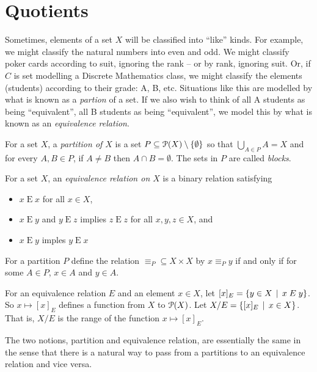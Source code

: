 \section{Quotients}

Sometimes, elements of a set $X$ will be classified into ``like'' kinds. 
For example, we might classify the natural numbers into even and odd. 
We might classify poker cards according to suit, ignoring the rank -- or by rank, ignoring suit. 
Or, if $C$ is  set modelling a Discrete Mathematics class, we might classify the elements (students) according to their grade: A, B, etc. 
Situations like this are modelled by what is known as a \emph{partion} of a set. If we also wish to think of all A students as being ``equivalent'', all B students as being ``equivalent'', we model this by what is known as an \emph{equivalence relation}.

\begin{defn}
	For a set $X$, a \emph{partition of $X$} is a set $P\subseteq{\mathcal{P}}(X)\setminus\{\emptyset\}$ so that $\bigcup_{A\in P}A = X$ and for every $A,B\in P$, if $A\neq B$ then $A\cap B=\emptyset$. The sets in $P$ are called \emph{blocks}. 
	
	For a set $X$, an \emph{equivalence relation on $X$} is a binary relation satisfying
	\begin{itemize}
		\item $x \mathrel{E}x$ for all $x\in X$,
		\item $x\mathrel{E}y$ and $y\mathrel{E}z$ implies $z\mathrel{E}z$ for all $x,y,z\in X$, and 
		\item $x\mathrel{E}y$ imples $y\mathrel{E}x$
	\end{itemize}
	
	For a partition $P$ define the relation $\mathord{\equiv_P}\subseteq X\times X$ by $x\equiv_P y$ if and only if for some $A\in P$, $x\in A$ and $y\in A$.
	
	For an equivalence relation $E$ and an element $x\in X$, let $[x]_E = \{y\in X\,\mid\, x\mathrel{E} y\}$. So $x\mapsto [x]_E$ defines a function from $X$ to ${\mathcal{P}}(X)$. Let $X/E= \{[x]_E\,\mid\, x\in X\}$.
	That is, $X/E$ is the range of the function $x\mapsto [x]_E$.
\end{defn}

The two notions, partition and equivalence relation, are essentially the same in the sense that there is a natural way to pass from a partitions to an equivalence relation and vice versa.


